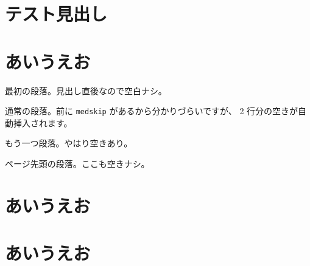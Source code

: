 \documentclass{jlreq}
\begin{document}
\section*{テスト見出し}
\section*{あいうえお}
最初の段落。見出し直後なので空白ナシ。

\medskip

通常の段落。前に \texttt{medskip} があるから分かりづらいですが、
2 行分の空きが自動挿入されます。

もう一つ段落。やはり空きあり。

\newpage

ページ先頭の段落。ここも空きナシ。
\section*{あいうえお}
\section*{あいうえお}
\end{document}
